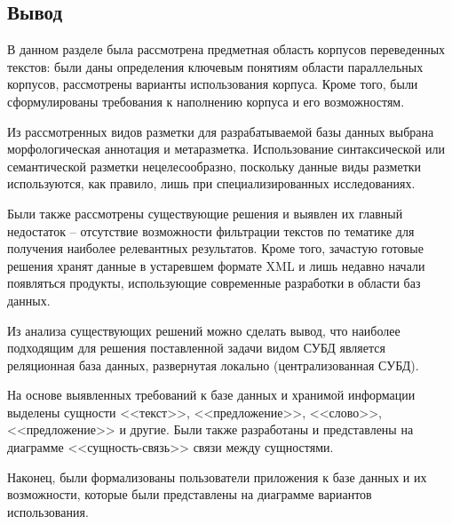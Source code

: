 \subsection*{Вывод}

В данном разделе была рассмотрена предметная область корпусов переведенных текстов: были даны определения ключевым понятиям области параллельных корпусов, рассмотрены варианты использования корпуса. 
Кроме того, были сформулированы требования к наполнению корпуса и его возможностям.

Из рассмотренных видов разметки для разрабатываемой базы данных выбрана морфологическая аннотация и метаразметка. 
Использование синтаксической или семантической разметки нецелесообразно, поскольку данные виды разметки используются, как правило, лишь при специализированных исследованиях.

Были также рассмотрены существующие решения и выявлен их главный недостаток -- отсутствие возможности фильтрации текстов по тематике для получения наиболее релевантных результатов. 
Кроме того, зачастую готовые решения хранят данные в устаревшем формате XML и лишь недавно начали появляться продукты, использующие современные разработки в области баз данных.

Из анализа существующих решений можно сделать вывод, что наиболее подходящим для решения поставленной задачи видом СУБД является реляционная база данных, развернутая локально (централизованная СУБД).

На основе выявленных требований к базе данных и хранимой информации выделены сущности <<текст>>, <<предложение>>, <<слово>>, <<предложение>> и другие. 
Были также разработаны и представлены на диаграмме <<сущность-связь>> связи между сущностями.

Наконец, были формализованы пользователи приложения к базе данных и их возможности, которые были представлены на диаграмме вариантов использования.

\pagebreak
